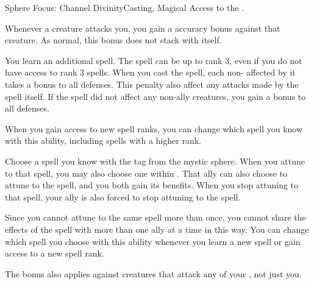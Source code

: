   \begin{magicalfeat}{Sphere Focus: Channel Divinity}{Casting, Magical}
    \featpre Access to the  .

     Whenever a creature attacks you, you  gain a  accuracy bonus against that creature.
    As normal, this bonus does not stack with itself.

     You learn an additional spell.
    The spell can be up to rank 3, even if you do not have access to rank 3 spells.
    When you cast the spell, each non- affected by it  takes a  bonus to all defenses.
    This penalty also affect any attacks made by the spell itself.
    If the spell did not affect any non-ally creatures, you  gain a  bonus to all defenses.

    When you gain access to new spell ranks, you can change which spell you know with this ability, including spells with a higher rank.

     Choose a spell you know with the  tag from the  mystic sphere.
    When you attune to that spell, you may also choose one  within \medrange.
    That ally can also choose to attune to the spell, and you both gain its benefits.
    When you stop attuning to that spell, your ally is also forced to stop attuning to the spell.

    Since you cannot attune to the same spell more than once, you cannot share the effects of the spell with more than one ally at a time in this way.
    You can change which spell you choose with this ability whenever you learn a new spell or gain access to a new spell rank.

     The bonus also applies against creatures that attack any of your , not just you.
  \end{magicalfeat}

